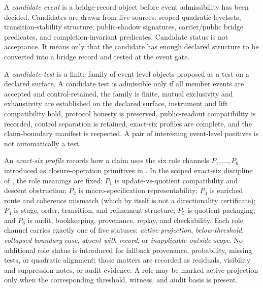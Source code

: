 \documentclass[11pt]{article}
\theoremstyle{definition}
\begin{document}
A \emph{candidate event} is a bridge-record object before event admissibility has been decided. Candidates are drawn from five sources: scoped quadratic levelsets, transition-stability structure, public-shadow signatures, carrier/public bridge predicates, and completion-invariant predicates. Candidate status is not acceptance. It means only that the candidate has enough declared structure to be converted into a bridge record and tested at the event gate.

A \emph{candidate test} is a finite family of event-level objects proposed as a test on a declared surface. A candidate test is admissible only if all member events are accepted and control-retained, the family is finite, mutual exclusivity and exhaustivity are established on the declared surface, instrument and lift compatibility hold, protocol honesty is preserved, public-readout compatibility is recorded, control separation is retained, exact-six profiles are complete, and the claim-boundary manifest is respected. A pair of interesting event-level positives is not automatically a test.

An \emph{exact-six profile} records how a claim uses the six role channels $P_1,\ldots,P_6$ introduced as closure-operation primitives in \citet{Tsiokos2026Foundations}. In the scoped exact-six discipline of \citet{Tsiokos2026FoundationsII}, the role meanings are fixed: $P_1$ is update-vs-quotient compatibility and descent obstruction; $P_2$ is macro-specification representability; $P_3$ is enriched route and coherence mismatch (which by itself is not a directionality certificate); $P_4$ is stage, order, transition, and refinement structure; $P_5$ is quotient packaging; and $P_6$ is audit, bookkeeping, provenance, replay, and checkability. Each role channel carries exactly one of five statuses: \emph{active-projection}, \emph{below-threshold}, \emph{collapsed-boundary-case}, \emph{absent-with-record}, or \emph{inapplicable-outside-scope}. No additional role status is introduced for fallback provenance, probability, missing tests, or quadratic alignment; those matters are recorded as residuals, visibility and suppression notes, or audit evidence. A role may be marked active-projection only when the corresponding threshold, witness, and audit basis is present.
\end{document}
